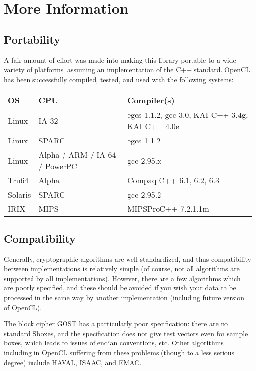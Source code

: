 \documentclass{article}
\begin{document}
\pagebreak

\section{More Information}

\subsection{Portability}

A fair amount of effort was made into making this library portable to a wide
variety of platforms, assuming an implementation of the C++ standard. OpenCL
has been successfully compiled, tested, and used with the following systems:

\newcommand{\sys}[3]{
#1 & #2 & #3 \\
}

\vskip 10pt \noindent
\begin{tabular}{|l|l|l|}                                          \hline
OS      & CPU             & Compiler(s)                        \\ \hline
\sys{Linux}  {IA-32} {egcs 1.1.2, gcc 3.0, KAI C++ 3.4g, KAI C++ 4.0e}
\sys{Linux}  {SPARC} {egcs 1.1.2}
\sys{Linux}  {Alpha / ARM / IA-64 / PowerPC}{gcc 2.95.x}
\sys{Tru64}  {Alpha} {Compaq C++ 6.1, 6.2, 6.3}
\sys{Solaris}{SPARC} {gcc 2.95.2}
\sys{IRIX}   {MIPS}  {MIPSProC++ 7.2.1.1m}
\hline
\end{tabular}
\vskip 10pt

\subsection{Compatibility}

Generally, cryptographic algorithms are well standardized, and thus
compatibility between implementations is relatively simple (of course, not all
algorithms are supported by all implementations). However, there are a few
algorithms which are poorly specified, and these should be avoided if you wish
your data to be processed in the same way by another implementation (including
future version of OpenCL).

The block cipher GOST has a particularly poor specification: there are no
standard Sboxes, and the specification does not give test vectors even for
sample boxes, which leads to issues of endian conventions, etc. Other
algorithms including in OpenCL suffering from these problems (though to a less
serious degree) include HAVAL, ISAAC, and EMAC.
\end{document}
